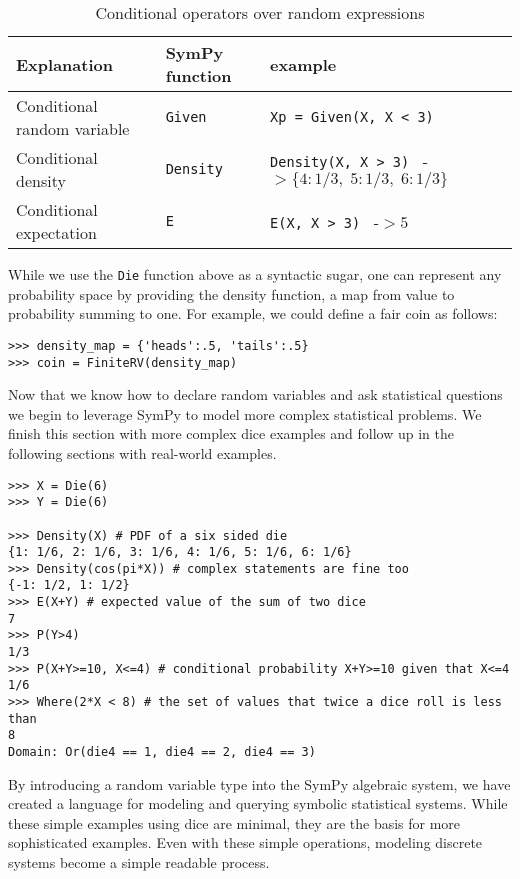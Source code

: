 \begin{table}[h]
\begin{tabular}{|lll|}
\hline
Explanation & SymPy function & example\\ \hline
Conditional random variable & {\tt Given} & {\tt Xp = Given(X, X < 3)} \\ \hline
Conditional density & {\tt Density} & {\tt Density(X, X > 3) } -$> \{4: 1/3,\; 5: 1/3,\; 6: 1/3\}$ \\ \hline
Conditional expectation  & {\tt E} & {\tt E(X, X > 3) } -$> 5$ \\ \hline
\end{tabular}
\label{tab:cond_ops}
\caption{Conditional operators over random expressions}
\end{table}

While we use the {\tt Die} function above as a syntactic sugar, one can
represent any probability space by providing the density function, a map
from value to probability summing to one. For example, we could define a fair coin as follows:
\begin{lstlisting}
>>> density_map = {'heads':.5, 'tails':.5}
>>> coin = FiniteRV(density_map)
\end{lstlisting}

Now that we know how to declare random variables and ask statistical questions we begin to leverage SymPy to model more complex statistical problems. We finish this section with more complex dice examples and follow up in the following sections with real-world examples.


\begin{lstlisting}
>>> X = Die(6)
>>> Y = Die(6)

>>> Density(X) # PDF of a six sided die
{1: 1/6, 2: 1/6, 3: 1/6, 4: 1/6, 5: 1/6, 6: 1/6}
>>> Density(cos(pi*X)) # complex statements are fine too
{-1: 1/2, 1: 1/2}
>>> E(X+Y) # expected value of the sum of two dice
7
>>> P(Y>4)
1/3
>>> P(X+Y>=10, X<=4) # conditional probability X+Y>=10 given that X<=4
1/6
>>> Where(2*X < 8) # the set of values that twice a dice roll is less than
8
Domain: Or(die4 == 1, die4 == 2, die4 == 3)
\end{lstlisting}


By introducing a random variable type into the SymPy algebraic system, we have
created a language for modeling and querying symbolic statistical systems.
While these simple examples using dice are minimal, they are the basis for more
sophisticated examples.  Even with these simple operations, modeling discrete
systems become a simple readable process.
